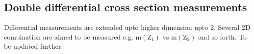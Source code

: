 \subsection{Double differential cross section measurements}
Differential measurements are extended upto higher dimension upto 2. Several 2D combination are aimed to be measured e.g. $\mathrm{m}(\mathrm{Z}_{1})$ vs $\mathrm{m}(\mathrm{Z}_{2})$ and so forth.
To be updated further.
%
